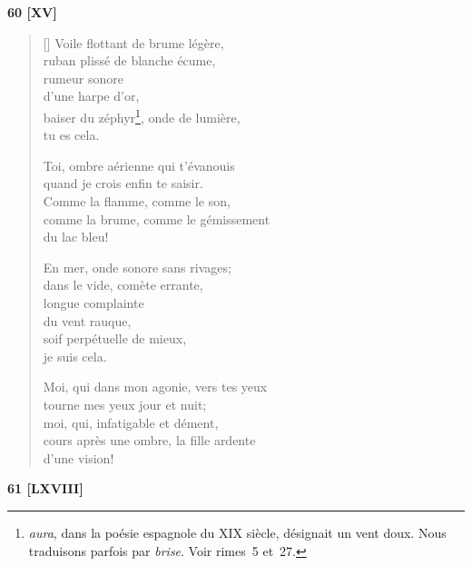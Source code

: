 \documentclass[a4paper,12pt]{book}
\begin{document}
\bigskip

\begin{center}
  \textbf{60 [XV]}
\end{center}

\settowidth{\versewidth}{Moi, qui dans mon agonie, vers tes yeux}

\begin{verse}[\versewidth]
  Voile flottant de brume légère, \\
  ruban plissé de blanche écume, \\
  rumeur sonore \\
  d'une harpe d'or, \\
  baiser du zéphyr\footnote{\emph{aura}, dans la poésie espagnole du XIX\ieme{}
  siècle, désignait un vent doux. Nous traduisons parfois par
  \emph{brise}. Voir rimes~5 et~27.}, onde de lumière, \\
  tu es cela.

  Toi, ombre aérienne qui t'évanouis \\
  quand je crois enfin te saisir. \\
  Comme la flamme, comme le son, \\
  comme la brume, comme le gémissement \\
  du lac bleu!

  En mer, onde sonore sans rivages; \\
  dans le vide, comète errante, \\
  longue complainte \\
  du vent rauque, \\
  soif perpétuelle de mieux, \\
  je suis cela.

  Moi, qui dans mon agonie, vers tes yeux \\
  tourne mes yeux jour et nuit; \\
  moi, qui, infatigable et dément, \\
  cours après une ombre, la fille ardente \\
  d'une vision!
\end{verse}

\bigskip

\begin{center}
  \textbf{61 [LXVIII]}
\end{center}

\settowidth{\versewidth}{et, pour la première fois, je sentis en le notant}
\end{document}
